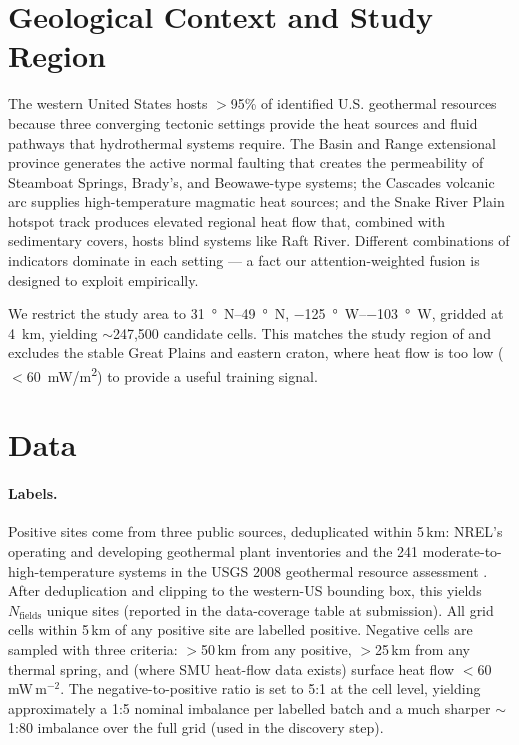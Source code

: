 \documentclass[review,12pt]{elsarticle}
\begin{document}
\section{Geological Context and Study Region}
\label{sec:context}

The western United States hosts $>$95\% of identified U.S. geothermal resources because three converging tectonic settings provide the heat sources and fluid pathways that hydrothermal systems require. The Basin and Range extensional province generates the active normal faulting that creates the permeability of Steamboat Springs, Brady's, and Beowawe-type systems; the Cascades volcanic arc supplies high-temperature magmatic heat sources; and the Snake River Plain hotspot track produces elevated regional heat flow that, combined with sedimentary covers, hosts blind systems like Raft River. Different combinations of indicators dominate in each setting — a fact our attention-weighted fusion is designed to exploit empirically.

We restrict the study area to \SIrange{31}{49}{\degree N}, \SIrange{-125}{-103}{\degree W}, gridded at \SI{4}{\kilo\meter}, yielding $\sim$247{,}500 candidate cells. This matches the study region of \citet{Faulds2020,Mordensky2025} and excludes the stable Great Plains and eastern craton, where heat flow is too low ($<$\SI{60}{mW/m^2}) to provide a useful training signal.

\section{Data}
\label{sec:data}

\paragraph{Labels.} Positive sites come from three public sources, deduplicated within 5\,km: NREL's operating and developing geothermal plant inventories and the 241 moderate-to-high-temperature systems in the USGS 2008 geothermal resource assessment \citep{Williams2008}. After deduplication and clipping to the western-US bounding box, this yields $N_\text{fields}$ unique sites (reported in the data-coverage table at submission). All grid cells within 5\,km of any positive site are labelled positive. Negative cells are sampled with three criteria: $>$50\,km from any positive, $>$25\,km from any thermal spring, and (where SMU heat-flow data exists) surface heat flow $<$60\,mW\,m$^{-2}$. The negative-to-positive ratio is set to 5:1 at the cell level, yielding approximately a 1:5 nominal imbalance per labelled batch and a much sharper $\sim$1:80 imbalance over the full grid (used in the discovery step).
\end{document}
